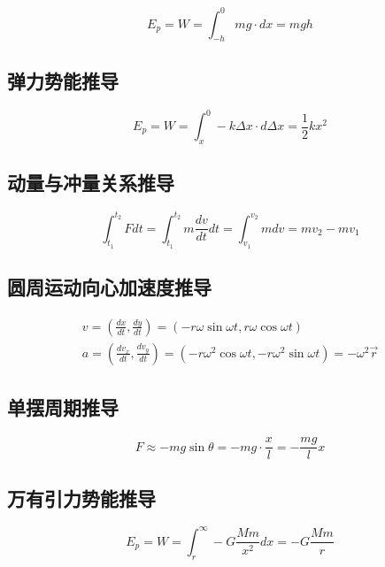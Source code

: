 \begin{equation*}
    E_p=W=\int_{-h}^0mg\cdot dx=mgh
\end{equation*}

\subsection{弹力势能推导}

\begin{equation*}
    E_p=W=\int_{x}^0-k\Delta x\cdot d\Delta x=\frac12kx^2
\end{equation*}

\subsection{动量与冲量关系推导}

\begin{equation*}
    \int_{t_1}^{t_2}Fdt
    =\int_{t_1}^{t_2}m\frac{dv}{dt}dt
    =\int_{v_1}^{v_2}mdv
    =mv_2-mv_1
\end{equation*}

\subsection{圆周运动向心加速度推导}

\begin{gather*}
    v=\left(\frac{dx}{dt},\frac{dy}{dt}\right)
    =(-r\omega\sin\omega t,r\omega\cos\omega t)\\
    a=\left(\frac{dv_x}{dt},\frac{dv_y}{dt}\right)
    =(-r\omega^2\cos\omega t,-r\omega^2\sin\omega t)
    =-\omega^2\vec{r}
\end{gather*}

\subsection{单摆周期推导}

\begin{equation*}
    F\approx -mg\sin\theta=-mg\cdot\frac{x}{l}=-\frac{mg}{l}x
\end{equation*}

\subsection{万有引力势能推导}

\begin{equation*}
    E_p=W=\int_r^\infty-G\frac{Mm}{x^2}dx=-G\frac{Mm}{r}
\end{equation*}

